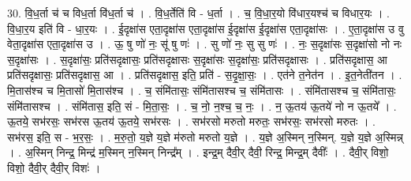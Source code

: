 \documentclass[17pt]{extarticle}
\begin{document}
30. वि॒ध॒र्ता च॑ च विध॒र्ता वि॑ध॒र्ता च॑ । . वि॒ध॒र्तेति॑ वि - ध॒र्ता । . च॒ वि॒धा॒र॒यो वि॑धार॒यश्च॑ च विधार॒यः । . वि॒धा॒र॒य इति॑ वि - धा॒र॒यः । . ई॒दृक्षा॑स एता॒दृक्षा॑स एता॒दृक्षा॑स ई॒दृक्षा॑स ई॒दृक्षा॑स एता॒दृक्षा॑सः । . ए॒ता॒दृक्षा॑स उ वु वेता॒दृक्षा॑स एता॒दृक्षा॑स उ । . ऊ॒ षु णो॑ नः॒ सू॑ षु णः॑ । . सु णो॑ नः॒ सु सु णः॑ । . नः॒ स॒दृक्षा॑सः स॒दृक्षा॑सो नो नः स॒दृक्षा॑सः । . स॒दृक्षा॑सः॒ प्रति॑सदृक्षासः॒ प्रति॑सदृक्षासः स॒दृक्षा॑सः स॒दृक्षा॑सः॒ प्रति॑सदृक्षासः । . प्रति॑सदृक्षास॒ आ प्रति॑सदृक्षासः॒ प्रति॑सदृक्षास॒ आ । . प्रति॑सदृक्षास॒ इति॒ प्रति॑ - स॒दृ॒क्षा॒सः॒ । . एत॑ने त॒नेत॑न । . इ॒त॒नेती॑तन । . मि॒तास॑श्च च मि॒तासो॑ मि॒तास॑श्च । . च॒ संमि॑तासः॒ संमि॑तासश्च च॒ संमि॑तासः । . संमि॑तासश्च च॒ संमि॑तासः॒ संमि॑तासश्च । . संमि॑तास॒ इति॒ सं - मि॒ता॒सः॒ । . च॒ नो॒ न॒श्च॒ च॒ नः॒ । . न॒ ऊ॒तय॑ ऊ॒तये॑ नो न ऊ॒तये᳚ । . ऊ॒तये॒ सभ॑रसः॒ सभ॑रस ऊ॒तय॑ ऊ॒तये॒ सभ॑रसः । . सभ॑रसो मरुतो मरुतः॒ सभ॑रसः॒ सभ॑रसो मरुतः । . सभ॑रस॒ इति॒ स - भ॒र॒सः॒ । . म॒रु॒तो॒ य॒ज्ञे य॒ज्ञे म॑रुतो मरुतो य॒ज्ञे । . य॒ज्ञे अ॒स्मिन् न॒स्मिन्. य॒ज्ञे य॒ज्ञे अ॒स्मिन्न् । . अ॒स्मिन् निन्द्र॒ मिन्द्र॑ म॒स्मिन् न॒स्मिन् निन्द्र᳚म् । . इन्द्र॒म् दैवी॒र् दैवी॒ रिन्द्र॒ मिन्द्र॒म् दैवीः᳚ । . दैवी॒र् विशो॒ विशो॒ दैवी॒र् दैवी॒र् विशः॑ । \newline
\end{document}
